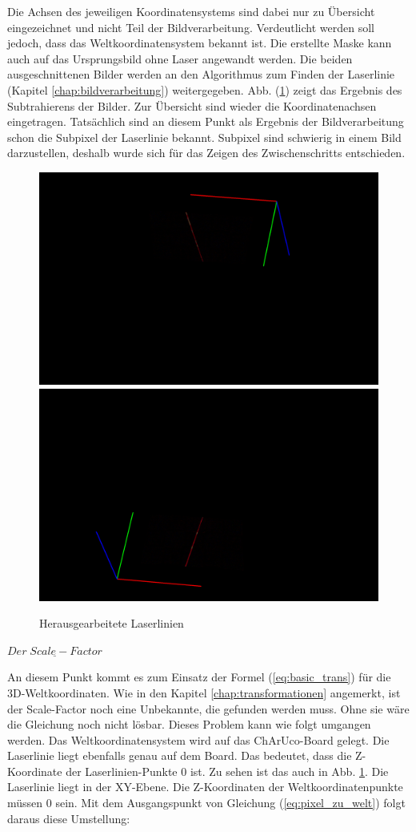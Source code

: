 		Die Achsen des jeweiligen Koordinatensystems sind dabei nur zu Übersicht eingezeichnet und nicht Teil der Bildverarbeitung. Verdeutlicht werden soll jedoch, dass das Weltkoordinatensystem bekannt ist. \newline
		Die erstellte Maske kann auch auf das Ursprungsbild ohne Laser angewandt werden. Die beiden ausgeschnittenen Bilder werden an den Algorithmus zum Finden der Laserlinie (Kapitel \ref{chap:bildverarbeitung}) weitergegeben. Abb. (\ref{fig:ext-calib-laserlines}) zeigt das Ergebnis des Subtrahierens der Bilder. Zur Übersicht sind wieder die Koordinatenachsen eingetragen. Tatsächlich sind an diesem Punkt als Ergebnis der Bildverarbeitung schon die Subpixel der Laserlinie bekannt. Subpixel sind schwierig in einem Bild darzustellen, deshalb wurde sich für das Zeigen des Zwischenschritts entschieden.
		\newpage
		\begin{figure}[h!]
			\centering
			\includegraphics[width=0.49\linewidth]{img/hauptteil/ext-calib/laserline_primary.png}
			\includegraphics[width=0.49\linewidth]{img/hauptteil/ext-calib/laserline_secondary.png}
			\caption{Herausgearbeitete Laserlinien}
			\label{fig:ext-calib-laserlines}
		\end{figure}
	
		$\underline{Der \; Scale-Factor}$
		
		An diesem Punkt kommt es zum Einsatz der Formel (\ref{eq:basic_trans}) für die 3D-Weltkoordinaten. Wie in den Kapitel \ref{chap:transformationen} angemerkt, ist der Scale-Factor noch eine Unbekannte, die gefunden werden muss. Ohne sie wäre die Gleichung noch nicht lösbar. Dieses Problem kann wie folgt umgangen werden. Das Weltkoordinatensystem wird auf das ChArUco-Board gelegt. Die Laserlinie liegt ebenfalls genau auf dem Board. Das bedeutet, dass die Z-Koordinate der Laserlinien-Punkte 0 ist. Zu sehen ist das auch in Abb. \ref{fig:ext-calib-laserlines}. Die Laserlinie liegt in der XY-Ebene. Die Z-Koordinaten der Weltkoordinatenpunkte müssen 0 sein. Mit dem Ausgangspunkt von Gleichung (\ref{eq:pixel_zu_welt}) folgt daraus diese Umstellung:
		

